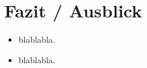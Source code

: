 
\chapter{Fazit / Ausblick} %
\label{cha:Fazit_Ausblick}
\begin{itemize}
	\item blablabla.
	
	\item blablabla.
		
\end{itemize}
